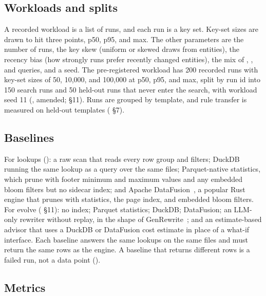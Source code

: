 \subsection{Workloads and splits}\label{sec:workloads}

A recorded workload is a list of runs, and each run is a key set. Key-set sizes
are drawn to hit three points, p50, p95, and max. The other parameters are the
number of runs, the key skew (uniform or skewed draws from entities), the
recency bias (how strongly runs prefer recently changed entities), the mix of
, , and  queries, and a seed. The
pre-registered workload has 200 recorded runs with key-set sizes of 50, 10,000,
and 100,000 at p50, p95, and max, split by run id into 150 search runs and 50
held-out runs that never enter the search, with workload seed 11
(, amended;  \S11). Runs are grouped by
template, and rule transfer is measured on held-out templates (
\S7).

\subsection{Baselines}\label{sec:baselines}

For lookups (): a raw scan that reads every row group and filters;
DuckDB running the same lookup as a query over the same files; Parquet-native
statistics, which prune with footer minimum and maximum values and any embedded
bloom filters but no sidecar index; and Apache DataFusion~\cite{datafusion}, a popular Rust engine that prunes with statistics, the page index, and embedded bloom filters. For evolve
( \S11): no index; Parquet statistics; DuckDB; DataFusion; an LLM-only
rewriter without replay, in the shape of GenRewrite~\cite{genrewrite}; and an
estimate-based advisor that uses a DuckDB or DataFusion cost estimate in place
of a what-if interface. Each baseline answers the same lookups on the same files
and must return the same rows as the engine. A baseline that returns different
rows is a failed run, not a data point ().

\subsection{Metrics}\label{sec:metrics}

